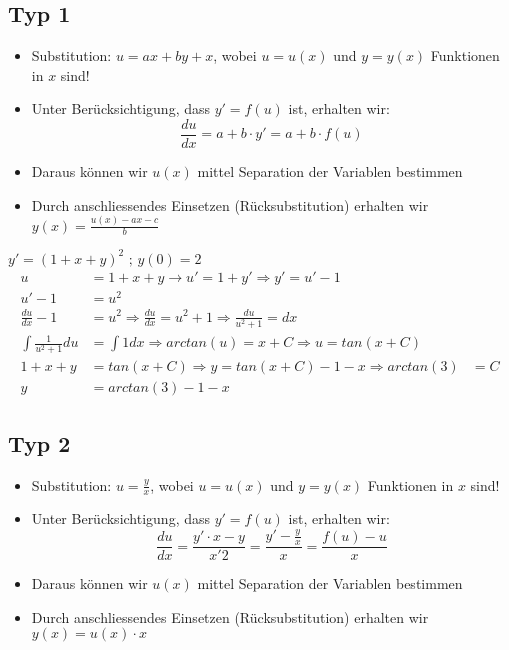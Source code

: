 \subsection{Typ 1}
\begin{itemize}
	\item Substitution: $u = ax + by + x$, wobei $u = u(x)$ und $y = y(x)$ Funktionen in $x$ sind!
	\item Unter Berücksichtigung, dass $y' = f(u)$ ist, erhalten wir:
	$$\frac{du}{dx} = a + b \cdot y' = a + b \cdot f(u)$$
	\item Daraus können wir $u(x)$ mittel Separation der Variablen bestimmen
	\item Durch anschliessendes Einsetzen (Rücksubstitution) erhalten wir $y(x) = \frac{u(x) - ax - c}{b}$
\end{itemize}

\begin{bsp}
$y' = (1 + x + y)^2 \text{ ; } y(0) = 2$
\begin{align*}
u &= 1 +x + y \rightarrow u' = 1 + y' \Rightarrow y' = u' -1 \\
u' -1 &= u^2 \\
\frac{du}{dx} -1 &= u^2 \Rightarrow \frac{du}{dx} = u^2 + 1 \Rightarrow \frac{du}{u^2+1} = dx \\
\int \frac{1}{u^2+1} du &= \int 1 dx \Rightarrow arctan(u) = x + C \Rightarrow u = tan(x+C) \\
1 + x + y &= tan(x+C) \Rightarrow y = tan(x+ C) -1 - x \Rightarrow arctan(3) &= C \\
y&=arctan(3) -1 -x
\end{align*}
\end{bsp}

\subsection{Typ 2}
\begin{itemize}
	\item Substitution: $u = \frac{y}{x}$, wobei $u = u(x)$ und $y = y(x)$ Funktionen in $x$ sind!
	\item Unter Berücksichtigung, dass $y' = f(u)$ ist, erhalten wir:
	$$\frac{du}{dx} = \frac{y' \cdot x -y }{x'2} = \frac{y' -\frac{y}{x}}{x} = \frac{f(u)-u}{x}$$
	\item Daraus können wir $u(x)$ mittel Separation der Variablen bestimmen
	\item Durch anschliessendes Einsetzen (Rücksubstitution) erhalten wir $y(x) = u(x) \cdot x$
\end{itemize}

